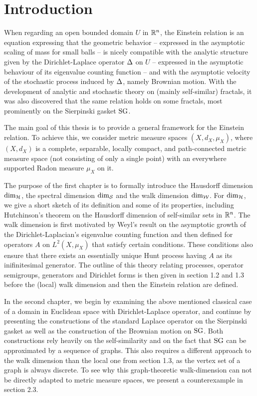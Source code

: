 \chapter*{Introduction}

When regarding an open bounded domain $U$ in $\mathbb{R}^n$, the Einstein relation is an equation expressing that the geometric behavior -- expressed in the asymptotic scaling of mass for small balls -- is nicely compatible with the analytic structure given by the Dirichlet-Laplace operator $\Delta$ on $U$ -- expressed in the asymptotic behaviour of its eigenvalue counting function -- and with the asymptotic velocity of the stochastic process induced by $\Delta$, namely Brownian motion. 
With the development of analytic and stochastic theory on (mainly self-similar) fractals, it was also discovered that the same relation holds on some fractals, most prominently on the Sierpinski gasket $\operatorname{SG}$. 

The main goal of this thesis is to provide a general framework for the Einstein relation. To achieve this, we consider metric measure spaces $(X,d_X,\mu_X)$, where $(X,d_X)$ is a complete, separable, locally compact, and path-connected metric measure space (not consisting of only a single point) with an everywhere supported Radon measure $\mu_X$ on it. 

The purpose of the first chapter is to formally introduce the Hausdorff dimension $\dim_{\mathcal{H}}$, the spectral dimension $\dim_{\mathcal{S}}$ and the walk dimension $\dim_{\mathcal{W}}$. For $\dim_{\mathcal{H}}$, we give a short sketch of its definition and some of its properties, including Hutchinson's theorem on the Hausdorff dimension of self-similar sets in $\mathbb{R}^n$. The walk dimension is first motivated by Weyl's result on the asymptotic growth of the Dirichlet-Laplacian's eigenvalue counting function and then defined for operators $A$ on $L^2(X,\mu_X)$ that satisfy certain conditions. These conditions also ensure that there exists an essentially unique Hunt process having $A$ as its inifinitesimal generator. The outline of this theory relating processes, operator semigroups, generators and Dirichlet forms is then given in section 1.2 and 1.3 before the (local) walk dimension and then the Einstein relation are defined.

In the second chapter, we begin by examining the above mentioned classical case of a domain in Euclidean space with Dirichlet-Laplace operator, and continue by presenting the constructions of the standard Laplace operator on the Sierpinski gasket as well as the construction of the Brownian motion on $\operatorname{SG}$. Both constructions rely heavily on the self-similarity and on the fact that $\operatorname{SG}$ can be approximated by a sequence of graphs. This also requires a different approach to the walk dimension than the local one from section 1.3, as the vertex set of a graph is always discrete. To see why this graph-theoretic walk-dimension can not be directly adapted to metric measure spaces, we present a counterexample in section 2.3.

